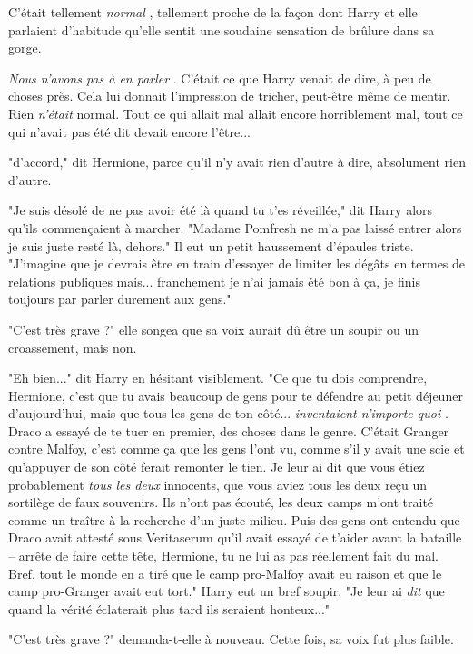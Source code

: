 C'était tellement \emph{normal} , tellement proche de la façon dont Harry et elle parlaient d'habitude qu'elle sentit une soudaine sensation de brûlure dans sa gorge.

\emph{Nous n'avons pas à en parler} . C'était ce que Harry venait de dire, à peu de choses près. Cela lui donnait l'impression de tricher, peut-être même de mentir. Rien \emph{n'était}  normal. Tout ce qui allait mal allait encore horriblement mal, tout ce qui n'avait pas été dit devait encore l'être...

"d'accord," dit Hermione, parce qu'il n'y avait rien d'autre à dire, absolument rien d'autre.

"Je suis désolé de ne pas avoir été là quand tu t'es réveillée," dit Harry alors qu'ils commençaient à marcher. "Madame Pomfresh ne m'a pas laissé entrer alors je suis juste resté là, dehors." Il eut un petit haussement d'épaules triste. "J'imagine que je devrais être en train d'essayer de limiter les dégâts en termes de relations publiques mais... franchement je n'ai jamais été bon à ça, je finis toujours par parler durement aux gens."

"C'est très grave ?" elle songea que sa voix aurait dû être un soupir ou un croassement, mais non.

"Eh bien..." dit Harry en hésitant visiblement. "Ce que tu dois comprendre, Hermione, c'est que tu avais beaucoup de gens pour te défendre au petit déjeuner d'aujourd'hui, mais que tous les gens de ton côté... \emph{inventaient n'importe quoi} . Draco a essayé de te tuer en premier, des choses dans le genre. C'était Granger contre Malfoy, c'est comme ça que les gens l'ont vu, comme s'il y avait une scie et qu'appuyer de son côté ferait remonter le tien. Je leur ai dit que vous étiez probablement \emph{tous les deux } innocents, que vous aviez tous les deux reçu un sortilège de faux souvenirs. Ils n'ont pas écouté, les deux camps m'ont traité comme un traître à la recherche d'un juste milieu. Puis des gens ont entendu que Draco avait attesté sous Veritaserum qu'il avait essayé de t'aider avant la bataille – arrête de faire cette tête, Hermione, tu ne lui as pas réellement fait du mal. Bref, tout le monde en a tiré que le camp pro-Malfoy avait eu raison et que le camp pro-Granger avait eut tort." Harry eut un bref soupir. "Je leur ai \emph{dit}  que quand la vérité éclaterait plus tard ils seraient honteux..."

"C'est très grave ?" demanda-t-elle à nouveau. Cette fois, sa voix fut plus faible.

